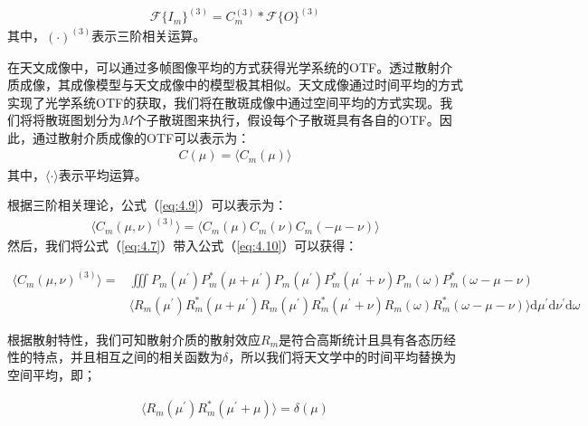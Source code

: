 \begin{equation}
\begin{aligned}
    \mathcal{F} \{ I_m \}^{(3)} = C_m^{(3)}*\mathcal{F}\{ O \}^{(3)}
\end{aligned}
\label{eq:4.8}
\end{equation}其中，$( \cdot ) ^{(3)}$表示三阶相关运算。

在天文成像中，可以通过多帧图像平均的方式获得光学系统的OTF。透过散射介质成像，其成像模型与天文成像中的模型极其相似。天文成像通过时间平均的方式实现了光学系统OTF的获取，我们将在散斑成像中通过空间平均的方式实现。我们将将散斑图划分为$M$个子散斑图来执行，假设每个子散斑具有各自的OTF。因此，通过散射介质成像的OTF可以表示为：
\begin{equation}
\begin{aligned}
    C(\mu) = \langle C_m(\mu)  \rangle
\end{aligned}
\label{eq:4.9}
\end{equation}其中，$\langle \cdot  \rangle$表示平均运算。

根据三阶相关理论\cite{lohmann_speckle_1983,northcott_algorithms_1988}，公式（\ref{eq:4.9}）可以表示为：
\begin{equation}
\begin{aligned}
    \langle C_m(\mu,\nu)^{(3)} \rangle= \langle C_m(\mu) C_m(\nu) C_m(-\mu-\nu)  \rangle
\end{aligned}
\label{eq:4.10}
\end{equation}然后，我们将公式（\ref{eq:4.7}）带入公式（\ref{eq:4.10}）可以获得：

\begin{equation}
\begin{aligned}
    \langle C_m(\mu,\nu)^{(3)} \rangle= &\iiint P_{m}(\mu^{\prime}) P_{m}^{*}(\mu + \mu^{\prime}) P_{m}(\mu^{\prime}) P_{m}^{*}(\mu^{\prime} + \nu) P_{m}(\omega) P_{m}^{*}(\omega -\mu - \nu) \\ &\langle R_{m}(\mu^{\prime}) R_{m}^{*}(\mu + \mu^{\prime}) R_{m}(\mu^{\prime}) R_{m}^{*}(\mu^{\prime} + \nu) R_{m}(\omega) R_{m}^{*}(\omega -\mu - \nu) \rangle \mathrm{d}{\mu^{\prime}} \mathrm{d}{\nu^{\prime}} \mathrm{d}{\omega}
\end{aligned}
\label{eq:4.11}
\end{equation}

根据散射特性，我们可知散射介质的散射效应$R_{m}$是符合高斯统计且具有各态历经性的特点，并且相互之间的相关函数为$\delta$，所以我们将天文学中的时间平均替换为空间平均，即；

\begin{equation}
\begin{aligned}
    \langle R_{m}(\mu^{\prime}) R_{m}^{*}(\mu^{\prime}+\mu) \rangle= \delta(\mu)
\end{aligned}
\label{eq:4.12}
\end{equation}

